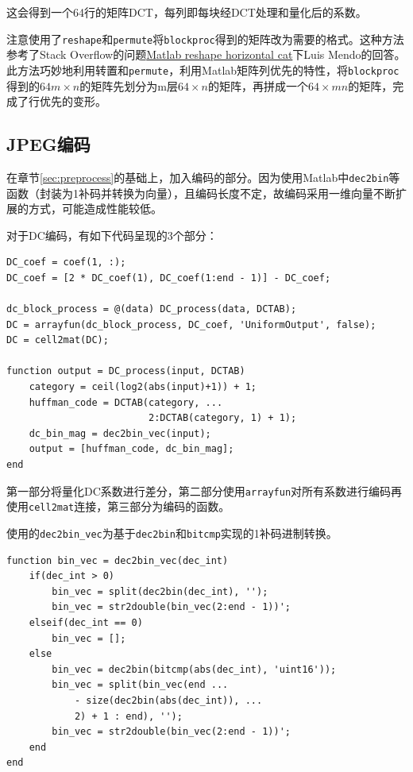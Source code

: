 \documentclass[10pt, a4paper]{article}
\begin{document}
这会得到一个64行的矩阵DCT，每列即每块经DCT处理和量化后的系数。

注意使用了\texttt{reshape}和\texttt{permute}将\texttt{blockproc}得到的矩阵改为需要的格式。这种方法参考了Stack Overflow的问题\href{https://stackoverflow.com/questions/24426686/matlab-reshape-horizontal-cat?r=SearchResults}{Matlab reshape horizontal cat}下Luis Mendo的回答。此方法巧妙地利用转置和\texttt{permute}，利用Matlab矩阵列优先的特性，将\texttt{blockproc}得到的$64 m \times n$的矩阵先划分为m层$64\times n$的矩阵，再拼成一个$64\times mn$的矩阵，完成了行优先的变形。

\subsection{JPEG编码}

在章节\ref*{sec:preprocess}的基础上，加入编码的部分。因为使用Matlab中\texttt{dec2bin}等函数（封装为1补码并转换为向量），且编码长度不定，故编码采用一维向量不断扩展的方式，可能造成性能较低。

对于DC编码，有如下代码呈现的3个部分：

\begin{verbatim}
DC_coef = coef(1, :);
DC_coef = [2 * DC_coef(1), DC_coef(1:end - 1)] - DC_coef;

dc_block_process = @(data) DC_process(data, DCTAB);
DC = arrayfun(dc_block_process, DC_coef, 'UniformOutput', false);
DC = cell2mat(DC);

function output = DC_process(input, DCTAB)
    category = ceil(log2(abs(input)+1)) + 1;
    huffman_code = DCTAB(category, ...
                         2:DCTAB(category, 1) + 1);
    dc_bin_mag = dec2bin_vec(input);
    output = [huffman_code, dc_bin_mag];
end
\end{verbatim}

第一部分将量化DC系数进行差分，第二部分使用\texttt{arrayfun}对所有系数进行编码再使用\texttt{cell2mat}连接，第三部分为编码的函数。

使用的\texttt{dec2bin_vec}为基于\texttt{dec2bin}和\texttt{bitcmp}实现的1补码进制转换。

\begin{verbatim}
function bin_vec = dec2bin_vec(dec_int)
    if(dec_int > 0)
        bin_vec = split(dec2bin(dec_int), '');
        bin_vec = str2double(bin_vec(2:end - 1))';
    elseif(dec_int == 0)
        bin_vec = [];
    else
        bin_vec = dec2bin(bitcmp(abs(dec_int), 'uint16'));
        bin_vec = split(bin_vec(end ...
            - size(dec2bin(abs(dec_int)), ...
            2) + 1 : end), '');
        bin_vec = str2double(bin_vec(2:end - 1))';
    end
end
\end{verbatim}
\end{document}
